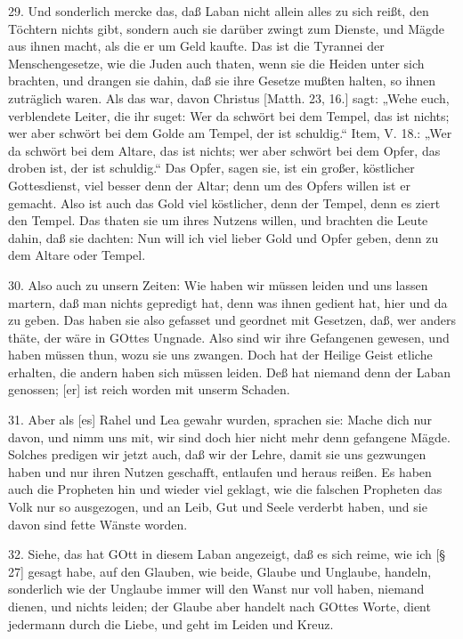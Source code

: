29. Und sonderlich mercke das, daß Laban nicht allein alles zu sich reißt, den Töchtern nichts gibt, sondern auch sie darüber zwingt zum Dienste, und Mägde aus ihnen macht, als die er um Geld kaufte. Das ist die Tyrannei der Menschengesetze, wie die Juden auch thaten, wenn sie die Heiden unter sich brachten, und drangen sie dahin, daß sie ihre Gesetze mußten halten, so ihnen zuträglich waren. Als das war, davon Christus [Matth. 23, 16.] sagt: „Wehe euch, verblendete Leiter, die ihr suget: Wer da schwört bei dem Tempel, das ist nichts; wer aber schwört bei dem Golde am Tempel, der ist schuldig.“ Item, V. 18.: „Wer da schwört bei dem Altare, das ist nichts; wer aber schwört bei dem Opfer, das droben ist, der ist schuldig.“ Das Opfer, sagen sie, ist ein großer, köstlicher Gottesdienst, viel besser denn der Altar; denn um des Opfers willen ist er gemacht. Also ist auch das Gold viel köstlicher, denn der Tempel, denn es ziert den Tempel. Das thaten sie um ihres Nutzens willen, und brachten die Leute dahin, daß sie dachten: Nun will ich viel lieber Gold und Opfer geben, denn zu dem Altare oder Tempel.

30. Also auch zu unsern Zeiten: Wie haben wir müssen leiden und uns lassen martern, daß man nichts gepredigt hat, denn was ihnen gedient hat, hier und da zu geben. Das haben sie also gefasset und geordnet mit Gesetzen, daß, wer anders thäte, der wäre in GOttes Ungnade. Also sind wir ihre Gefangenen gewesen, und haben müssen thun, wozu sie uns zwangen. Doch hat der Heilige Geist etliche erhalten, die andern haben sich müssen leiden. Deß hat niemand denn der Laban genossen; [er] ist reich worden mit unserm Schaden.

31. Aber als [es] Rahel und Lea gewahr wurden, sprachen sie: Mache dich nur davon, und nimm uns mit, wir sind doch hier nicht mehr denn gefangene Mägde. Solches predigen wir jetzt auch, daß wir der Lehre, damit sie uns gezwungen haben und nur ihren Nutzen geschafft, entlaufen und heraus reißen. Es haben auch die Propheten hin und wieder viel geklagt, wie die falschen Propheten das Volk nur so ausgezogen, und an Leib, Gut und Seele verderbt haben, und sie davon sind fette Wänste worden.

32. Siehe, das hat GOtt in diesem Laban angezeigt, daß es sich reime, wie ich [§ 27] gesagt habe, auf den Glauben, wie beide, Glaube und Unglaube, handeln, sonderlich wie der Unglaube immer will den Wanst nur voll haben, niemand dienen, und nichts leiden; der Glaube aber handelt nach GOttes Worte, dient jedermann durch die Liebe, und geht im Leiden und Kreuz.

